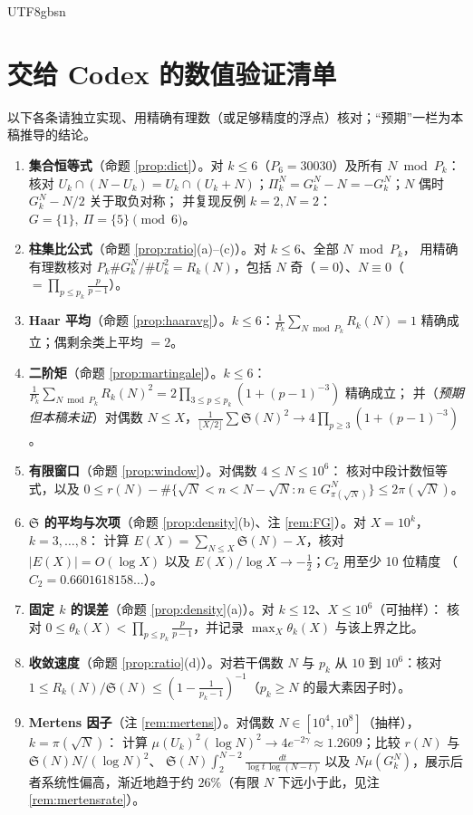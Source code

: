 \documentclass[11pt,a4paper]{article}
\newcommand{\Haar}{\mu}
\newcommand{\Sing}{\mathfrak S}
\theoremstyle{plain}
\theoremstyle{definition}
\begin{document}
\begin{CJK}{UTF8}{gbsn}
\section{交给 Codex 的数值验证清单}\label{sec:numerics}

以下各条请独立实现、用精确有理数（或足够精度的浮点）核对；“预期”一栏为本稿推导的结论。
\begin{enumerate}[label=\textbf{V\arabic*.},leftmargin=*]
\item \textbf{集合恒等式}（命题 \ref{prop:dict}）。对 $k\le6$（$P_6=30030$）及所有 $N\bmod P_k$：
核对 $U_k\cap(N-U_k)=U_k\cap(U_k+N)$；$\Pi_k^N=G_k^N-N=-G_k^N$；$N$ 偶时 $G_k^N-N/2$ 关于取负对称；
并复现反例 $k=2,N=2$：$G=\{1\},\ \Pi=\{5\}\pmod 6$。
\item \textbf{柱集比公式}（命题 \ref{prop:ratio}(a)--(c)）。对 $k\le6$、全部 $N\bmod P_k$，
用精确有理数核对 $P_k\#G_k^N/\#U_k^2=R_k(N)$，包括 $N$ 奇（$=0$）、$N\equiv0$（$=\prod_{p\le p_k}\frac p{p-1}$）。
\item \textbf{Haar 平均}（命题 \ref{prop:haaravg}）。$k\le6$：$\frac1{P_k}\sum_{N\bmod P_k}R_k(N)=1$ 精确成立；偶剩余类上平均 $=2$。
\item \textbf{二阶矩}（命题 \ref{prop:martingale}）。$k\le6$：$\frac1{P_k}\sum_{N\bmod P_k}R_k(N)^2=2\prod_{3\le p\le p_k}(1+(p-1)^{-3})$ 精确成立；
并（\emph{预期但本稿未证}）对偶数 $N\le X$，$\frac1{\lfloor X/2\rfloor}\sum\Sing(N)^2\to 4\prod_{p\ge3}(1+(p-1)^{-3})$。
\item \textbf{有限窗口}（命题 \ref{prop:window}）。对偶数 $4\le N\le10^6$：
核对中段计数恒等式，以及 $0\le r(N)-\#\{\sqrt N<n<N-\sqrt N: n\in G_{\pi(\sqrt N)}^N\}\le2\pi(\sqrt N)$。
\item \textbf{$\Sing$ 的平均与次项}（命题 \ref{prop:density}(b)、注 \ref{rem:FG}）。对 $X=10^k$，$k=3,\dots,8$：
计算 $E(X)=\sum_{N\le X}\Sing(N)-X$，核对 $|E(X)|=O(\log X)$ 以及 $E(X)/\log X\to-\tfrac12$；$C_2$ 用至少 10 位精度
（$C_2=0.6601618158\ldots$）。
\item \textbf{固定 $k$ 的误差}（命题 \ref{prop:density}(a)）。对 $k\le12$、$X\le10^6$（可抽样）：
核对 $0\le\theta_k(X)<\prod_{p\le p_k}\frac p{p-1}$，并记录 $\max_X\theta_k(X)$ 与该上界之比。
\item \textbf{收敛速度}（命题 \ref{prop:ratio}(d)）。对若干偶数 $N$ 与 $p_k$ 从 $10$ 到 $10^6$：核对
$1\le R_k(N)/\Sing(N)\le(1-\frac1{p_k-1})^{-1}$（$p_k\ge N$ 的最大素因子时）。
\item \textbf{Mertens 因子}（注 \ref{rem:mertens}）。对偶数 $N\in[10^4,10^8]$（抽样），$k=\pi(\sqrt N)$：
计算 $\Haar(U_k)^2(\log N)^2\to4e^{-2\gamma}\approx1.2609$；比较 $r(N)$ 与 $\Sing(N)N/(\log N)^2$、
$\Sing(N)\int_2^{N-2}\frac{dt}{\log t\,\log(N-t)}$ 以及 $N\Haar(G_k^N)$，展示后者系统性偏高，渐近地趋于约 $26\%$（有限 $N$ 下远小于此，见注 \ref{rem:mertensrate}）。
\end{enumerate}


\end{CJK}
\end{document}
